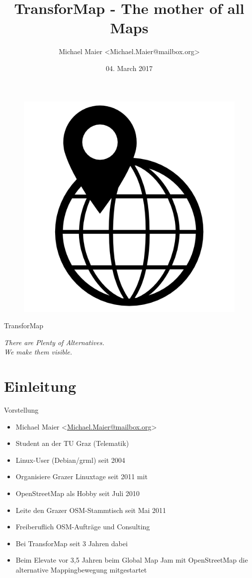 \documentclass{beamer}
\title{TransforMap - The mother of all Maps}
\author{Michael Maier \textless Michael.Maier@mailbox.org\textgreater}
\date{04. March 2017}
\begin{document}

\begin{frame} 


\begin{figure}
  \centering
  \includegraphics[width=.5\textwidth]{logo.png}
\end{figure}

\begin{center}
\Huge{TransforMap\\}
\end{center}

\begin{center}
\Large{\emph{There are Plenty of Alternatives. \\ We make them visible.}}
\end{center}

\end{frame}


\section{Einleitung}


\begin{frame}{Vorstellung}

  \begin{itemize}
    \item Michael Maier \textless \href{mailto:Michael.Maier@mailbox.org}{Michael.Maier@mailbox.org}\textgreater
    \item Student an der TU Graz (Telematik)
\vspace{0.3cm}
    \item Linux-User (Debian/grml) seit 2004
    \item Organisiere Grazer Linuxtage seit 2011 mit
    \item OpenStreetMap als Hobby seit Juli 2010
    \item Leite den Grazer OSM-Stammtisch seit Mai 2011
\vspace{0.3cm}
    \item Freiberuflich OSM-Aufträge und Consulting
    \item Bei TransforMap seit 3 Jahren dabei
    \item Beim Elevate vor 3,5 Jahren beim Global Map Jam mit OpenStreetMap die alternative Mappingbewegung mitgestartet
  \end{itemize}
\end{frame}
\end{document}
